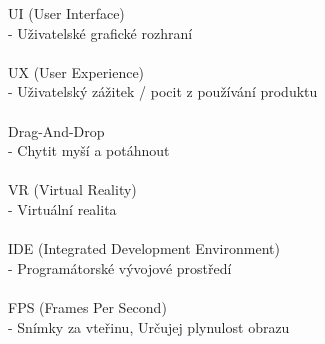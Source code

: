     UI (User Interface) \\ - Uživatelské grafické rozhraní \\\\
    UX (User Experience) \\ - Uživatelský zážitek / pocit z používání produktu \\\\
    Drag-And-Drop \\ - Chytit myší a potáhnout\\\\
    VR (Virtual Reality) \\ - Virtuální realita\\\\
    IDE (Integrated Development Environment) \\ - Programátorské vývojové prostředí\\\\
    FPS (Frames Per Second) \\ - Snímky za vteřinu, Určujej plynulost obrazu\\\\
